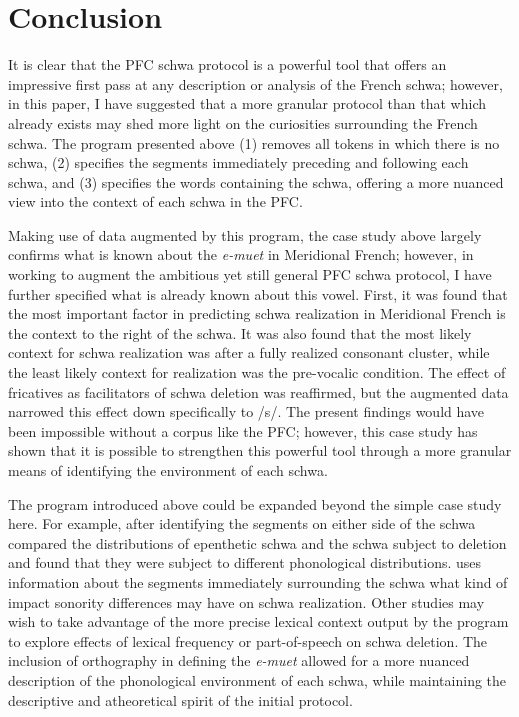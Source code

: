 \documentclass[output=paper,colorlinks,citecolor=brown,
]{langscibook}
\begin{document}
\section{Conclusion}
\label{sec:griffiths:conc}
It is clear that the PFC schwa protocol is a powerful tool that offers an impressive first pass at any description or analysis of the French schwa; however, in this paper, I have suggested that a more granular protocol than that which already exists may shed more light on the curiosities surrounding the French schwa. The program presented above (1) removes all tokens in which there is no schwa, (2) specifies the segments immediately preceding and following each schwa, and (3) specifies the words containing the schwa, offering a more nuanced view into the context of each schwa in the PFC.

Making use of data augmented by this program, the case study above largely confirms what is known about the \textit{e-muet} in Meridional French; however, in working to augment the ambitious yet still general PFC schwa protocol, I have further specified what is already known about this vowel. First, it was found that the most important factor in predicting schwa realization in Meridional French is the context to the right of the schwa. It was also found that the most likely context for schwa realization was after a fully realized consonant cluster, while the least likely context for realization was the pre-vocalic condition. The effect of fricatives as facilitators of schwa deletion was reaffirmed, but the augmented data narrowed this effect down specifically to /s/. The present findings would have been impossible without a corpus like the PFC; however, this case study has shown that it is possible to strengthen this powerful tool through a more granular means of identifying the environment of each schwa. 

The program introduced above could be expanded beyond the simple case study here. For example, after identifying the segments on either side of the schwa \citet{griffiths} compared the distributions of epenthetic schwa and the schwa subject to deletion and found that they were subject to different phonological distributions. \citet{eychenne2} uses information about the segments immediately surrounding the schwa what kind of impact sonority differences may have on schwa realization. Other studies may wish to take advantage of the more precise lexical context output by the program to explore effects of lexical frequency or part-of-speech on schwa deletion.  The inclusion of orthography in defining the \textit{e-muet} allowed for a more nuanced description of the phonological environment of each schwa, while maintaining the descriptive and atheoretical spirit of the initial protocol.
\end{document}
